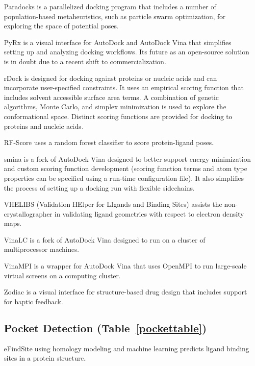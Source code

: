 Paradocks \cite{Meier_2010} is a parallelized docking program that includes a number of population-based metaheuristics, such as particle swarm optimization, for exploring the space of potential poses.

PyRx \cite{Dallakyan_2014} is a visual interface for AutoDock and AutoDock Vina that simplifies setting up and analyzing docking workflows.  Its future as an open-source solution is in doubt due to a recent shift to commercialization.

rDock \cite{Ruiz_Carmona_2014}  is designed for docking against proteins or nucleic acids and can incorporate user-specified constraints. It uses an empirical scoring function that includes solvent accessible surface area terms. A combination of genetic algorithms, Monte Carlo, and simplex minimization is used to explore the conformational space. Distinct scoring functions are provided for docking to proteins and nucleic acids.

RF-Score \cite{Li_2015,Ballester_2010} uses a random forest classifier to score protein-ligand poses.

smina \cite{Koes_2013} is a fork of AutoDock Vina designed to better support energy minimization and custom scoring function development (scoring function terms and atom type properties can be specified using a run-time configuration file). It also simplifies the process of setting up a docking run with flexible sidechains.

VHELIBS (Validation HElper for LIgands and Binding Sites) \cite{Cereto_Massagu__2013} assists the non-crystallographer in validating ligand geometries with respect to electron density maps.

VinaLC  \cite{Zhang_2013} is a fork of AutoDock Vina designed to run on a cluster of multiprocessor machines.

VinaMPI \cite{Ellingson_2013} is a wrapper for AutoDock Vina that uses OpenMPI to run large-scale virtual screens on a computing cluster.

Zodiac \cite{Zonta_2008} is a visual interface for structure-based drug design that includes support for haptic feedback.

\subsection*{Pocket Detection (Table~\ref{pockettable})}
eFindSite \cite{Brylinski_2013} using homology modeling and machine learning predicts ligand binding sites in a protein structure.

